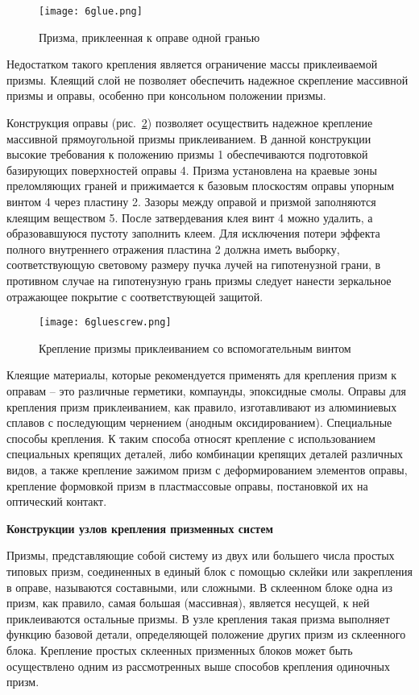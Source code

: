 \begin{figure}[h!]
	\caption{ Призма, приклеенная к оправе одной гранью }
	\texttt{[image: 6glue.png]}
	\label{pic:6glue}
\end{figure} 

Недостатком такого крепления является ограничение массы приклеиваемой призмы. Клеящий слой не позволяет обеспечить надежное скрепление массивной призмы и оправы, особенно при консольном положении призмы.

Конструкция оправы (рис.~\ref{pic:6gluescrew}) позволяет осуществить надежное крепление массивной прямоугольной призмы приклеиванием. В данной конструкции высокие требования к положению призмы 1 обеспечиваются подготовкой базирующих поверхностей оправы 4. Призма установлена на краевые зоны преломляющих граней и прижимается к базовым плоскостям оправы упорным винтом 4 через пластину 2. Зазоры между оправой и призмой заполняются клеящим веществом 5. После затвердевания клея винт 4 можно удалить, а образовавшуюся пустоту заполнить клеем. Для исключения потери эффекта полного внутреннего отражения пластина 2 должна иметь выборку, соответствующую световому размеру пучка лучей на гипотенузной грани, в противном случае на гипотенузную грань призмы следует нанести зеркальное отражающее покрытие с соответствующей защитой.

\begin{figure}[h!]
	\caption{ Крепление призмы приклеиванием со вспомогательным винтом }
	\texttt{[image: 6gluescrew.png]}
	\label{pic:6gluescrew}
\end{figure}

Клеящие материалы, которые рекомендуется применять для крепления призм к оправам -- это различные герметики, компаунды, эпоксидные смолы.
Оправы для крепления призм приклеиванием, как правило, изготавливают из алюминиевых сплавов с последующим чернением (анодным оксидированием).
Специальные способы крепления. К таким способа относят крепление с использованием специальных крепящих деталей, либо комбинации крепящих деталей различных видов, а также крепление зажимом призм с деформированием элементов оправы, крепление формовкой призм в пластмассовые оправы, постановкой их на оптический контакт.

\begin{flushleft}
	\textbf{Конструкции узлов крепления призменных систем}
\end{flushleft}

Призмы, представляющие собой систему из двух или большего числа простых типовых призм, соединенных в единый блок с помощью склейки или закрепления в оправе, называются составными, или сложными. В склеенном блоке одна из призм, как правило, самая большая (массивная), является несущей, к ней приклеиваются остальные призмы. В узле крепления такая призма выполняет функцию базовой детали, определяющей положение других призм из склеенного блока. Крепление простых склеенных призменных блоков может быть осуществлено одним из рассмотренных выше способов крепления одиночных призм.

